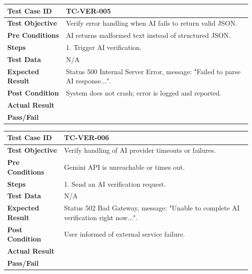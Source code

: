 \begin{longtable}{|p{}|p{}|}
\hline
\textbf{Test Case ID} & TC-VER-005 \\ \hline
\textbf{Test Objective} & Verify error handling when AI fails to return valid JSON. \\ \hline
\textbf{Pre Conditions} & AI returns malformed text instead of structured JSON. \\ \hline
\textbf{Steps} & 
1. Trigger AI verification. \\ \hline
\textbf{Test Data} & N/A \\ \hline
\textbf{Expected Result} & Status 500 Internal Server Error, message: "Failed to parse AI response...". \\ \hline
\textbf{Post Condition} & System does not crash; error is logged and reported. \\ \hline
\textbf{Actual Result} &  \\ \hline
\textbf{Pass/Fail} &  \\ \hline
\end{longtable}

\begin{longtable}{|p{}|p{}|}
\hline
\textbf{Test Case ID} & TC-VER-006 \\ \hline
\textbf{Test Objective} & Verify handling of AI provider timeouts or failures. \\ \hline
\textbf{Pre Conditions} & Gemini API is unreachable or times out. \\ \hline
\textbf{Steps} & 
1. Send an AI verification request. \\ \hline
\textbf{Test Data} & N/A \\ \hline
\textbf{Expected Result} & Status 502 Bad Gateway, message: "Unable to complete AI verification right now...". \\ \hline
\textbf{Post Condition} & User informed of external service failure. \\ \hline
\textbf{Actual Result} &  \\ \hline
\textbf{Pass/Fail} &  \\ \hline
\end{longtable}

